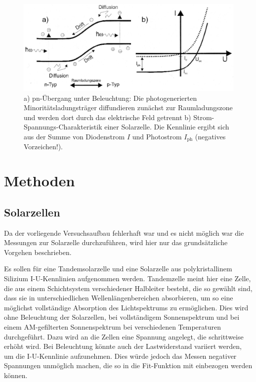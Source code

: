 \documentclass[
	a4paper,
	12pt,
	pagesize,
	ngerman
]{scrartcl}
\begin{document}
	\begin{figure}[H]
			\includegraphics[width= 0.8 \linewidth]{img/photodiode} %
			\caption{
			a) pn-Übergang unter Beleuchtung: Die photogenerierten Minoritätsladungsträger diffundieren zunächst zur Raumladungszone und werden dort durch das elektrische Feld getrennt
			b) Strom-Spannungs-Charakteristik einer Solarzelle. Die Kennlinie ergibt sich aus der Summe von Diodenstrom $ I $ und Photostrom $ I_\text{ph} $ (negatives Vorzeichen!).
			\cite{anleitung}
			}
			\label{fig_photodiode_kennlinie}
	\end{figure}

	\section{Methoden}
	\subsection{Solarzellen}
	Da der vorliegende Versuchsaufbau fehlerhaft war und es nicht möglich war die Messungen zur Solarzelle durchzuführen, wird hier nur das grundsätzliche Vorgehen beschrieben.

	Es sollen für eine Tandemsolarzelle und eine Solarzelle aus polykristallinem Silizium I-U-Kennlinien aufgenommen werden.
	Tandemzelle meint hier eine Zelle, die aus einem Schichtsystem verschiedener Halbleiter besteht, die so gewählt sind, dass sie in unterschiedlichen Wellenlängenbereichen absorbieren, um so eine möglichst vollständige Absorption des Lichtspektrums zu ermöglichen.
	Dies wird ohne Beleuchtung der Solarzellen, bei vollständigem Sonnenspektrum und bei einem AM-gefilterten Sonnenspektrum bei verschiedenen Temperaturen durchgeführt.
	Dazu wird an die Zellen eine Spannung angelegt, die schrittweise erhöht wird.
	Bei Beleuchtung könnte auch der Lastwiderstand variiert werden, um die I-U-Kennlinie aufzunehmen.
	Dies würde jedoch das Messen negativer Spannungen unmöglich machen, die so in die Fit-Funktion mit einbezogen werden können.
\end{document}
